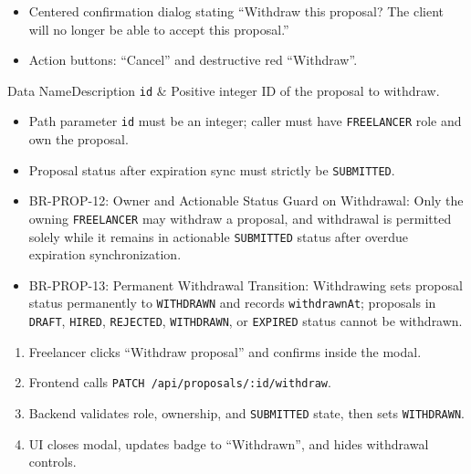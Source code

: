 \begin{itemize}[leftmargin=1.6em,topsep=3pt,itemsep=2pt,parsep=0pt,label=$\bullet$]
    \item Centered confirmation dialog stating ``Withdraw this proposal? The client will no longer be able to accept this proposal.''
    \item Action buttons: ``Cancel'' and destructive red ``Withdraw''.
\end{itemize}


\begin{specdatatable}{Data Name}{Description}
\texttt{id} & Positive integer ID of the proposal to withdraw.\\ \hline
\end{specdatatable}

\begin{itemize}[leftmargin=1.6em,topsep=3pt,itemsep=2pt,parsep=0pt,label=$\bullet$]
    \item Path parameter \texttt{id} must be an integer; caller must have \texttt{FREELANCER} role and own the proposal.
    \item Proposal status after expiration sync must strictly be \texttt{SUBMITTED}.
\end{itemize}

\begin{itemize}[leftmargin=1.6em,topsep=3pt,itemsep=2pt,parsep=0pt,label=$\bullet$]\brrulelist
    \item BR-PROP-12: Owner and Actionable Status Guard on Withdrawal: Only the owning \texttt{FREELANCER} may withdraw a proposal, and withdrawal is permitted solely while it remains in actionable \texttt{SUBMITTED} status after overdue expiration synchronization.
    \item BR-PROP-13: Permanent Withdrawal Transition: Withdrawing sets proposal status permanently to \texttt{WITHDRAWN} and records \texttt{withdrawnAt}; proposals in \texttt{DRAFT}, \texttt{HIRED}, \texttt{REJECTED}, \texttt{WITHDRAWN}, or \texttt{EXPIRED} status cannot be withdrawn.
\end{itemize}

\begin{enumerate}[leftmargin=1.8em,topsep=3pt,itemsep=2pt,parsep=0pt]
    \item Freelancer clicks ``Withdraw proposal'' and confirms inside the modal.
    \item Frontend calls \texttt{PATCH /api/proposals/:id/withdraw}.
    \item Backend validates role, ownership, and \texttt{SUBMITTED} state, then sets \texttt{WITHDRAWN}.
    \item UI closes modal, updates badge to ``Withdrawn'', and hides withdrawal controls.
\end{enumerate}

